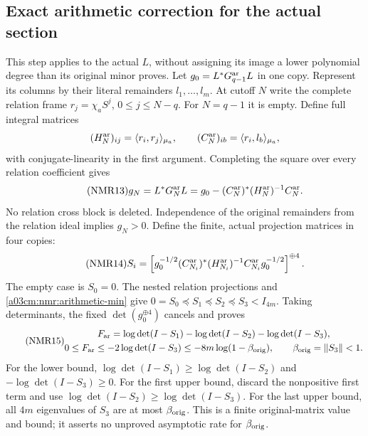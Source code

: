 \subsection{Exact arithmetic correction for the actual section}
This step applies to the actual $L$, without assigning its image a
lower polynomial degree than its original minor proves.
Let $g_0=L^*G_{q-1}^{\rm ar}L$ in one copy.
Represent its columns by their literal remainders $l_1,\ldots,l_m$.
At cutoff $N$ write the complete relation frame
$r_j=\chi_aS^j$, $0\leq j\leq N-q$.
For $N=q-1$ it is empty. Define full integral matrices
\[
(H_N^{\rm ar})_{ij}=\langle r_i,r_j\rangle_{\mu_a},\qquad
(C_N^{\rm ar})_{ib}=\langle r_i,l_b\rangle_{\mu_a},
\]
with conjugate-linearity in the first argument. Completing the square
over every relation coefficient gives
\begin{equation}\tag{NMR13}\label{a03cm:nmr:arithmetic-min}
g_N=L^*G_N^{\rm ar}L
 =g_0-(C_N^{\rm ar})^*(H_N^{\rm ar})^{-1}C_N^{\rm ar}.
\end{equation}
No relation cross block is deleted. Independence of the original
remainders from the relation ideal implies $g_N>0$.
Define the finite, actual projection matrices in four copies:
\begin{equation}\tag{NMR14}\label{a03cm:nmr:projection}
S_i=\left[
g_0^{-1/2}(C_{N_i}^{\rm ar})^*
(H_{N_i}^{\rm ar})^{-1}C_{N_i}^{\rm ar}g_0^{-1/2}
\right]^{\oplus4}.
\end{equation}
The empty case is $S_0=0$. The nested relation projections and
\eqref{a03cm:nmr:arithmetic-min} give
$0=S_0\preceq S_1\preceq S_2\preceq S_3<I_{4m}$.
Taking determinants, the fixed $\det(g_0^{\oplus4})$ cancels and
proves
\begin{equation}\tag{NMR15}\label{a03cm:nmr:Far}
\begin{gathered}
F_{\rm ar}
=\log\det(I-S_1)-\log\det(I-S_2)-\log\det(I-S_3),\\
0\leq F_{\rm ar}\leq-2\log\det(I-S_3)
              \leq-8m\log(1-\beta_{\rm orig}),\qquad
\beta_{\rm orig}=\|S_3\|<1 .
\end{gathered}
\end{equation}
For the lower bound, $\log\det(I-S_1)\geq\log\det(I-S_2)$
and $-\log\det(I-S_3)\geq0$.
For the first upper bound, discard the nonpositive first term and
use $\log\det(I-S_2)\geq\log\det(I-S_3)$.
For the last upper bound, all $4m$ eigenvalues of $S_3$ are at most
$\beta_{\rm orig}$.
This is a finite original-matrix value and bound; it asserts no
unproved asymptotic rate for $\beta_{\rm orig}$.

